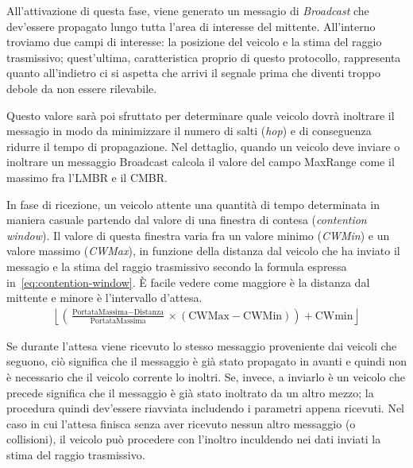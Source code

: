 All'attivazione di questa fase, viene generato un messagio di \textit{Broadcast} che dev'essere propagato lungo tutta l'area di interesse del mittente.
All'interno troviamo due campi di interesse: la posizione del veicolo e la stima del raggio trasmissivo; quest'ultima, caratteristica proprio di questo protocollo,
rappresenta quanto all'indietro ci si aspetta che arrivi il segnale prima che diventi troppo debole da non essere rilevabile.

Questo valore sarà poi sfruttato per determinare quale veicolo dovrà inoltrare il messagio in modo da minimizzare il numero di salti (\textit{hop}) e di conseguenza
ridurre il tempo di propagazione.
Nel dettaglio, quando un veicolo deve inviare o inoltrare un messaggio Broadcast calcola il valore del campo MaxRange come il massimo fra l'LMBR e il CMBR.

In fase di ricezione, un veicolo attente una quantità di tempo determinata in maniera casuale partendo dal valore di una finestra di contesa (\textit{contention window}).
Il valore di questa finestra varia fra un valore minimo (\textit{CWMin}) e un valore massimo (\textit{CWMax}), in funzione della distanza dal veicolo che ha inviato il messagio
e la stima del raggio trasmissivo secondo la formula espressa in~\ref{eq:contention-window}.
È facile vedere come maggiore è la distanza dal mittente e minore è l'intervallo d'attesa.
\begin{gather}\label{eq:contention-window}
	\left\lfloor \left( \frac{\text{PortataMassima} - \text{Distanza}}{\text{PortataMassima}} \times (\text{CWMax} - \text{CWMin}) \right) + \text{CWmin}  \right\rfloor
\end{gather}

Se durante l'attesa viene ricevuto lo stesso messaggio proveniente dai veicoli che seguono, ciò significa che il messaggio è già stato propagato in avanti e quindi non è necessario
che il veicolo corrente lo inoltri.
Se, invece, a inviarlo è un veicolo che precede significa che il messaggio è già stato inoltrato da un altro mezzo; la procedura quindi dev'essere riavviata includendo i parametri appena ricevuti.
Nel caso in cui l'attesa finisca senza aver ricevuto nessun altro messaggio (o collisioni), il veicolo può procedere con l'inoltro inculdendo nei dati inviati la stima del raggio trasmissivo.

